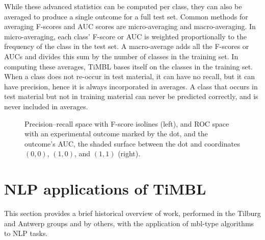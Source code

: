 \documentclass{report}
\begin{document}
While these advanced statistics can be computed per class, they can
also be averaged to produce a single outcome for a full test
set. Common methods for averaging F-scores and AUC scores are
micro-averaging and macro-averaging. In micro-averaging, each class'
F-score or AUC is weighted proportionally to the frequency of the
class in the test set. A macro-average adds all the F-scores or AUCs
and divides this sum by the number of classes in the training set. In
computing these averages, TiMBL bases itself on the classes in the
training set. When a class does not re-occur in test material, it can
have no recall, but it can have precision, hence it is always
incorporated in averages. A class that occurs in test material but not
in training material can never be predicted correctly, and is never
included in averages.

\begin{figure}
\begin{center}

\begin{minipage}[t]{0.53\textwidth}
\end{minipage}\hfill
\begin{minipage}[t]{0.47\textwidth}
\end{minipage}

\end{center}
\caption{Precision--recall space with F-score isolines (left), and ROC
  space with an experimental outcome marked by the dot, and the
  outcome's AUC, the shaded surface between the dot and coordinates
  $(0,0)$, $(1,0)$, and $(1,1)$ (right). \label{spaces}}
\end{figure}



\section{NLP applications of TiMBL}
\label{furtherreading}

This section provides a brief historical overview of work, performed
in the Tilburg and Antwerp groups and by others, with the application
of {\sc mbl}-type algorithms to NLP tasks.
\end{document}
